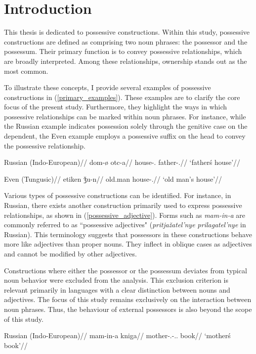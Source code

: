 \section{Introduction}

This thesis is dedicated to possessive constructions. Within this study, possessive constructions are defined as comprising two noun phrases: the possessor and the possessum. Their primary function is to convey possessive relationships, which are broadly interpreted. Among these relationships, ownership stands out as the most common.

To illustrate these concepts, I provide several examples of possessive constructions in (\ref{primary_examples}). These examples are to clarify the core focus of the present study. Furthermore, they highlight the ways in which possessive relationships can be marked within noun phrases. For instance, while the Russian example indicates possession solely through the genitive case on the dependent, the Even example employs a possessive suffix on the head to convey the possessive relationship.

\pex
\label{primary_examples}
\a
\begingl
\glpreamble Russian (Indo-European)//
\gla dom-\o{} otc-a//
\glb house-\Nom.\Sg{} father-\Gen.\Sg{}//
\glft `father\'s house'//
\endgl 

\a
\begingl
\glpreamble Even (Tungusic)//
\gla etiken  ǯu-n//
\glb old.man house-\Poss.\Tsg{}//
\glft `old man's house'//
\endgl 
\xe

Various types of possessive constructions can be identified. For instance, in Russian, there exists another construction primarily used to express possessive relationships, as shown in (\ref{possessive_adjective}). Forms such as \textit{mam-in-a} are commonly referred to as ``possessive adjectives" (\textit{pritjažatel'nye prilagatel'nye} in Russian). This terminology suggests that possessors in these constructions behave more like adjectives than proper nouns. They inflect in oblique cases as adjectives and cannot be modified by other adjectives.

Constructions where either the possessor or the possessum deviates from typical noun behavior were excluded from the analysis. This exclusion criterion is relevant primarily in languages with a clear distinction between nouns and adjectives. The focus of this study remains exclusively on the interaction between noun phrases. Thus, the behaviour of external possessors is also beyond the scope of this study.

\ex
\label{possessive_adjective}
\begingl
\glpreamble Russian (Indo-European)//
\gla mam-in-a kniga//
\glb mother-\Poss.\Adj-\Nom.\Sg.\F{} book//
\glft `mother\'s book'//
\endgl
\xe

